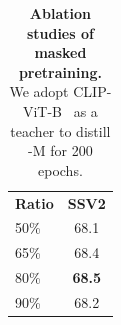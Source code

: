 \begin{table}[t]
\begin{minipage}[t]{0.22\linewidth}
{            \begin{tabular}{l|c}
                \textbf{Ratio} & \textbf{SSV2} \\
                \Xhline{1.0pt}
                50\% & 68.1 \\
                65\% & 68.4 \\
                \rowcolor{gray!20}
                80\% & \textbf{68.5} \\
                90\% & 68.2 \\
            \end{tabular}
        }
        \label{ablation_mask_ratio}
    \end{minipage}
    \hspace{0.3mm}
    \ 
    \begin{minipage}[t]{0.18\linewidth}
        \vspace{0pt}
        \centering
        \setlength\tabcolsep{5.2pt}
        \label{ablation_mask_droppath}
    \end{minipage}
    \vspace{-0.3cm}
    \caption{
        \textbf{Ablation studies of masked pretraining.}
        We adopt CLIP-ViT-B~\cite{clip} as a teacher to distill \ModelName-M for 200 epochs.
    }
    \label{ablation_mask}
    \vspace{-0.5cm}
\end{table}
